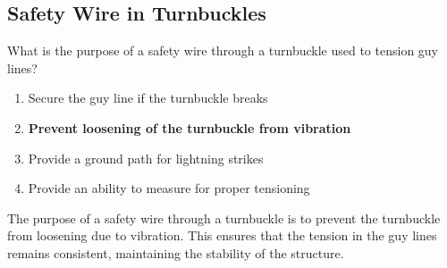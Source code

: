 \subsection{Safety Wire in Turnbuckles}
\label{T0B05}

\begin{tcolorbox}[colback=gray!10!white,colframe=black!75!black,title=T0B05]
What is the purpose of a safety wire through a turnbuckle used to tension guy lines?
\begin{enumerate}[noitemsep]
    \item Secure the guy line if the turnbuckle breaks
    \item \textbf{Prevent loosening of the turnbuckle from vibration}
    \item Provide a ground path for lightning strikes
    \item Provide an ability to measure for proper tensioning
\end{enumerate}
\end{tcolorbox}

The purpose of a safety wire through a turnbuckle is to prevent the turnbuckle from loosening due to vibration. This ensures that the tension in the guy lines remains consistent, maintaining the stability of the structure.